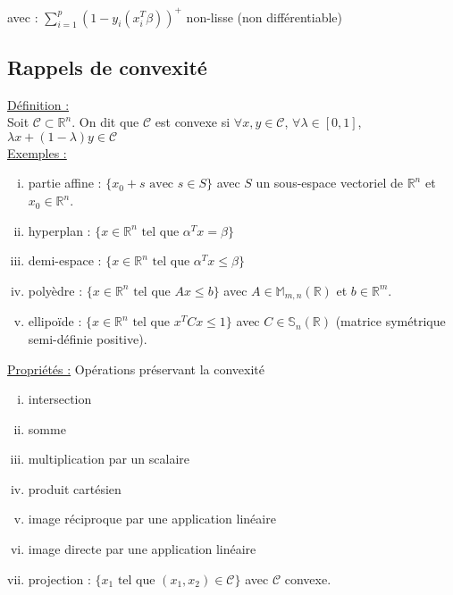 \documentclass[12pt,a4paper]{article}
\begin{document}
avec : $\sum_{i=1}^p (1 - y_i (x_i^T \beta))^+$ non-lisse (non différentiable)\\

\subsection{Rappels de convexité}

\underline{Définition :} \\
Soit $\mathcal{C} \subset \mathbb{R}^n$. On dit que $\mathcal{C}$ est convexe si $\forall x, y \in \mathcal{C}$, $\forall \lambda \in [0, 1]$, $\lambda x + (1 - \lambda) y \in \mathcal{C}$\\

\underline{Exemples :}\\

\begin{enumerate}[i)]
    \item partie affine : $\{x_0 + s \text{ avec } s \in S\}$ avec $S$ un sous-espace vectoriel de $\mathbb{R}^n$ et $x_0 \in \mathbb{R}^n$.
    \item hyperplan : $\{x \in \mathbb{R}^n \text{ tel que } \alpha^T x = \beta\}$
    \item demi-espace : $\{x \in \mathbb{R}^n \text{ tel que } \alpha^T x \leq \beta\}$
    \item polyèdre : $\{x \in \mathbb{R}^n \text{ tel que } Ax \leq b\}$ avec $A \in \mathbb{M}_{m,n}(\mathbb{R})$ et $b \in \mathbb{R}^m$.
    \item ellipoïde : $\{x \in \mathbb{R}^n \text{ tel que } x^TCx \leq 1\}$ avec $C \in \mathbb{S}_n(\mathbb{R})$ (matrice symétrique semi-définie positive).
\end{enumerate}


\underline{Propriétés :} Opérations préservant la convexité\\
\begin{enumerate}[i)]
    \item intersection
    \item somme
    \item multiplication par un scalaire
    \item produit cartésien
    \item image réciproque par une application linéaire
    \item image directe par une application linéaire
    \item projection : $\{x_1 \text{ tel que } (x_1, x_2) \in \mathcal{C}\}$ avec $\mathcal{C}$ convexe.
\end{enumerate}
\end{document}
